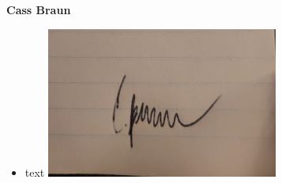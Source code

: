\documentclass[]{article}
\numberwithin{figure}{section}
\begin{document}


\textbf{Cass Braun}
\begin{itemize}
    \setlength\itemindent{2em}
    \item text
\includegraphics[width=0.6\textwidth]{Cass.jpg}
\end{itemize}
\end{document}
